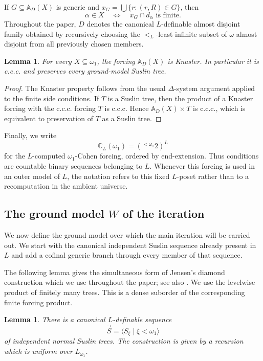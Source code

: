 \documentclass[a4paper,11pt]{article}
\newtheorem{lemma}[theorem]{Lemma}
\begin{document}
If $G\subseteq\mathbb A_D(X)$ is generic and
$x_G=\bigcup\{r:(r,R)\in G\}$, then
\[
   \alpha\in X\quad\Longleftrightarrow\quad
   x_G\cap d_\alpha\text{ is finite}.
\]
Throughout the paper, $D$ denotes the canonical $L$-definable almost disjoint
family obtained by recursively choosing the $<_L$-least infinite subset of
$\omega$ almost disjoint from all previously chosen members.

\begin{lemma}\label{a.d.coding preserves Suslin trees}
For every $X\subseteq\omega_1$, the forcing $\mathbb A_D(X)$ is Knaster.  In
particular it is c.c.c. and preserves every ground-model Suslin tree.
\end{lemma}

\begin{proof}
The Knaster property follows from the usual $\Delta$-system argument applied
to the finite side conditions.  If $T$ is a Suslin tree, then the product of a
Knaster forcing with the c.c.c. forcing $T$ is c.c.c.  Hence
$\mathbb A_D(X)\times T$ is c.c.c., which is equivalent to preservation of
$T$ as a Suslin tree.
\end{proof}

Finally, we write
\[
   \mathbb C_L(\omega_1)=({}^{<\omega_1}2)^L
\]
for the $L$-computed $\omega_1$-Cohen forcing, ordered by end-extension.  Thus
conditions are countable binary sequences belonging to $L$.  Whenever this
forcing is used in an outer model of $L$, the notation refers to this fixed
$L$-poset rather than to a recomputation in the ambient universe.

\subsection[The ground model W of the iteration]{The ground model $W$ of the iteration}
We now define the ground model over which the main iteration will be carried
out.  We start with the canonical independent Suslin sequence already present
in $L$ and add a cofinal generic branch through every member of that sequence.

The following lemma gives the simultaneous form of Jensen's diamond
construction which we use throughout the paper; see also \cite{Jech}.  We use
the levelwise product of finitely many trees.  This is a dense suborder of the
corresponding finite forcing product.

\begin{lemma}
\label{canonical-L-Suslin-sequence}
There is a canonical $L$-definable sequence
\[
   \vec S=\langle S_\xi\mid\xi<\omega_1\rangle
\]
of independent normal Suslin trees.  The construction is given by a recursion
which is uniform over $L_{\omega_1}$.
\end{lemma}
\end{document}
